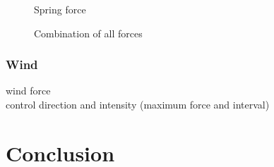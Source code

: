 \documentclass[11pt,a4paper]{scrartcl}
\begin{document}
\begin{figure}[htbp]
\centering
{}
\caption{Spring force}
\end{figure}

\begin{figure}[htbp]
\centering
{}
\caption{Combination of all forces}
\end{figure}


\newpage
\subsubsection{Wind}
wind force \\ control direction and intensity (maximum force and interval)


\section{Conclusion}
\end{document}
